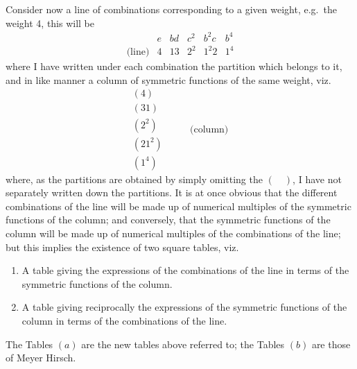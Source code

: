 \documentclass[11pt,a4paper]{article}
\begin{document}
Consider now a line of combinations corresponding to a given weight, e.g.\ the
weight 4, this will be
\[
\begin{array}{c|ccccc}
& e & bd & c^2 & b^2 c & b^4 \\ \hline
\text{(line)} & 4 & 13 & 2^2 & 1^2 2 & 1^4
\end{array}
\]
where I have written under each combination the partition which belongs to it,
and in like manner a column of symmetric functions of the same weight, viz.
\[
\begin{array}{c}
(4) \\
(31) \\
(2^2) \\
(21^2) \\
(1^4)
\end{array}
\qquad
\begin{array}{c}
\text{(column)}
\end{array}
\]
where, as the partitions are obtained by simply omitting the $(\quad)$, I have
not separately written down the partitions. It is at once obvious that the
different combinations of the line will be made up of numerical multiples of
the symmetric functions of the column; and conversely, that the symmetric
functions of the column will be made up of numerical multiples of the
combinations of the line; but this implies the existence of two square tables,
viz.
\begin{enumerate}[label=(\alph*)]
\item A table giving the expressions of the combinations of the line in terms
of the symmetric functions of the column.
\item A table giving reciprocally the expressions of the symmetric functions
of the column in terms of the combinations of the line.
\end{enumerate}

The Tables $(a)$ are the new tables above referred to; the Tables $(b)$ are
those of Meyer Hirsch.
\end{document}
